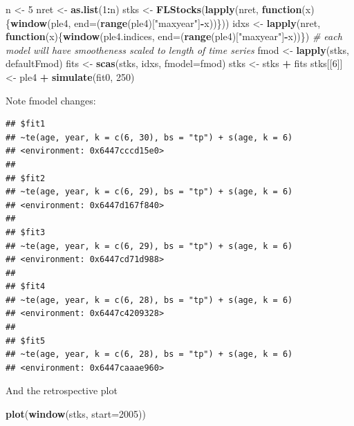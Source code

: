 \documentclass[
]{book}
\newenvironment{Shaded}{\begin{snugshade}}{\end{snugshade}}
\newcommand{\AttributeTok}[1]{\textcolor[rgb]{0.13,0.29,0.53}{#1}}
\newcommand{\CommentTok}[1]{\textcolor[rgb]{0.56,0.35,0.01}{\textit{#1}}}
\newcommand{\ControlFlowTok}[1]{\textcolor[rgb]{0.13,0.29,0.53}{\textbf{#1}}}
\newcommand{\DecValTok}[1]{\textcolor[rgb]{0.00,0.00,0.81}{#1}}
\newcommand{\FunctionTok}[1]{\textcolor[rgb]{0.13,0.29,0.53}{\textbf{#1}}}
\newcommand{\NormalTok}[1]{#1}
\newcommand{\OtherTok}[1]{\textcolor[rgb]{0.56,0.35,0.01}{#1}}
\newcommand{\SpecialCharTok}[1]{\textcolor[rgb]{0.81,0.36,0.00}{\textbf{#1}}}
\newcommand{\StringTok}[1]{\textcolor[rgb]{0.31,0.60,0.02}{#1}}
\begin{document}
\begin{Shaded}
\begin{Highlighting}[]
\NormalTok{n }\OtherTok{\textless{}{-}} \DecValTok{5}
\NormalTok{nret }\OtherTok{\textless{}{-}} \FunctionTok{as.list}\NormalTok{(}\DecValTok{1}\SpecialCharTok{:}\NormalTok{n)}
\NormalTok{stks }\OtherTok{\textless{}{-}} \FunctionTok{FLStocks}\NormalTok{(}\FunctionTok{lapply}\NormalTok{(nret, }\ControlFlowTok{function}\NormalTok{(x)\{}\FunctionTok{window}\NormalTok{(ple4, }\AttributeTok{end=}\NormalTok{(}\FunctionTok{range}\NormalTok{(ple4)[}\StringTok{"maxyear"}\NormalTok{]}\SpecialCharTok{{-}}\NormalTok{x))\}))}
\NormalTok{idxs }\OtherTok{\textless{}{-}} \FunctionTok{lapply}\NormalTok{(nret, }\ControlFlowTok{function}\NormalTok{(x)\{}\FunctionTok{window}\NormalTok{(ple4.indices, }\AttributeTok{end=}\NormalTok{(}\FunctionTok{range}\NormalTok{(ple4)[}\StringTok{"maxyear"}\NormalTok{]}\SpecialCharTok{{-}}\NormalTok{x))\})}
\CommentTok{\# each model will have smootheness scaled to length of time series}
\NormalTok{fmod }\OtherTok{\textless{}{-}} \FunctionTok{lapply}\NormalTok{(stks, defaultFmod)}
\NormalTok{fits }\OtherTok{\textless{}{-}} \FunctionTok{scas}\NormalTok{(stks, idxs, }\AttributeTok{fmodel=}\NormalTok{fmod)}
\NormalTok{stks }\OtherTok{\textless{}{-}}\NormalTok{ stks }\SpecialCharTok{+}\NormalTok{ fits}
\NormalTok{stks[[}\DecValTok{6}\NormalTok{]] }\OtherTok{\textless{}{-}}\NormalTok{ ple4 }\SpecialCharTok{+} \FunctionTok{simulate}\NormalTok{(fit0, }\DecValTok{250}\NormalTok{)}
\end{Highlighting}
\end{Shaded}

Note fmodel changes:

\begin{verbatim}
## $fit1
## ~te(age, year, k = c(6, 30), bs = "tp") + s(age, k = 6)
## <environment: 0x6447cccd15e0>
## 
## $fit2
## ~te(age, year, k = c(6, 29), bs = "tp") + s(age, k = 6)
## <environment: 0x6447d167f840>
## 
## $fit3
## ~te(age, year, k = c(6, 29), bs = "tp") + s(age, k = 6)
## <environment: 0x6447cd71d988>
## 
## $fit4
## ~te(age, year, k = c(6, 28), bs = "tp") + s(age, k = 6)
## <environment: 0x6447c4209328>
## 
## $fit5
## ~te(age, year, k = c(6, 28), bs = "tp") + s(age, k = 6)
## <environment: 0x6447caaae960>
\end{verbatim}

And the retrospective plot

\begin{Shaded}
\begin{Highlighting}[]
\FunctionTok{plot}\NormalTok{(}\FunctionTok{window}\NormalTok{(stks, }\AttributeTok{start=}\DecValTok{2005}\NormalTok{))}
\end{Highlighting}
\end{Shaded}
\end{document}
